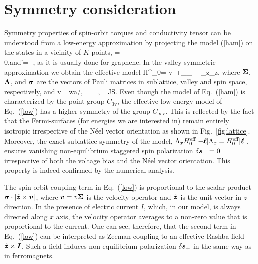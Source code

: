 \section{Symmetry consideration} 

Symmetry properties of spin-orbit torques and conductivity tensor can be understood from a low-energy approximation by projecting the model (\ref{ham}) on the states in a vicinity of $K$ points, 
\be
{}= \\ 0\epm,\quad\mbox{and}\quad {}'= -,
\e
as it is usually done for graphene. In the valley symmetric approximation we obtain the effective model
\be
\label{low}
H^_0= v\, \cdot\bb{\Sigma}+\alpha_\lt[\bb{\sigma}\times\bb{\Sigma}\rt]_{} - \Delta\,\bb{\ell}\cdot\bb{\sigma}\,\Sigma_z\Lambda_z,
\e
where $\boldsymbol{\Sigma}$, $\boldsymbol{\Lambda}$, and $\boldsymbol{\sigma}$ are the vectors of Pauli matrices in sublattice, valley and spin space, respectively, and 
\be
v=  wa/\hslash, \qquad \alpha_=  \lambda , \qquad \Delta=JS.
\e
Even though the model of Eq.~(\ref{ham}) is characterized by the point group $C_\text{3v}$, the effective low-energy model of Eq.~(\ref{low}) has a higher symmetry 
of the group $C_{\infty\text{v}}$. This is reflected by the fact that the Fermi-surfaces (for energies we are interested in) remain entirely isotropic irrespective of the N\'eel vector orientation as shown in Fig.~\ref{fig:lattice}. Moreover, the exact sublattice symmetry of the model, $\Lambda_x H^\text{eff}_0[-\boldsymbol{\ell}] \Lambda_x =H^\text{eff}_0[\boldsymbol{\ell}]$, ensures vanishing non-equilibrium staggered spin polarization $\delta \boldsymbol{s}_-=0$ irrespective of both the voltage bias and the N\'eel vector orientation. This property is indeed confirmed by the numerical analysis. 

The spin-orbit coupling term in Eq.~(\ref{low}) is proportional to the scalar product $\boldsymbol{\sigma}\cdot \left[\hat{\boldsymbol{z}}\times \boldsymbol{v}\right]$, where $\boldsymbol{v}=v\boldsymbol{\Sigma}$ is the velocity operator and $\hat{\boldsymbol{z}}$ is the unit vector in $z$ direction. In the presence of electric current $I$, which, in our model, is always directed along $x$ axis, the velocity operator averages to a non-zero value that is proportional to the current. One can see, therefore, that the second term in Eq.~(\ref{low}) can be interpreted as Zeeman coupling to an effective Rashba field $\hat{\boldsymbol{z}}\times \boldsymbol{I}$. Such a field induces non-equilibrium polarization $\delta\boldsymbol{s}_+$ in the same way as in ferromagnets. 

